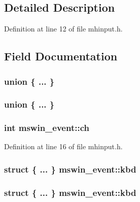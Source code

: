 \subsection{Detailed Description}


Definition at line 12 of file mhinput.\+h.



\subsection{Field Documentation}
\hypertarget{structmswin__event_aee279d14f88567b29a6879fe8aecb2a8}{\subsubsection[{"@34}]{\setlength{\rightskip}{0pt plus 5cm}union \{ ... \} }}\label{structmswin__event_aee279d14f88567b29a6879fe8aecb2a8}
\hypertarget{structmswin__event_a504b7fb000579af49b551a807d3fbce8}{\subsubsection[{"@46}]{\setlength{\rightskip}{0pt plus 5cm}union \{ ... \} }}\label{structmswin__event_a504b7fb000579af49b551a807d3fbce8}
\hypertarget{structmswin__event_a65ae83d1c2eb060bc9bffde57071fdb9}{
\subsubsection[{ch}]{\setlength{\rightskip}{0pt plus 5cm}int mswin\+\_\+event\+::ch}}\label{structmswin__event_a65ae83d1c2eb060bc9bffde57071fdb9}


Definition at line 16 of file mhinput.\+h.

\hypertarget{structmswin__event_a3aac2cede6fd42df678df4df934b2de8}{
\subsubsection[{kbd}]{\setlength{\rightskip}{0pt plus 5cm}struct \{ ... \}   mswin\+\_\+event\+::kbd}}\label{structmswin__event_a3aac2cede6fd42df678df4df934b2de8}
\hypertarget{structmswin__event_a42d63af297fdf4fdf081198553a74c57}{
\subsubsection[{kbd}]{\setlength{\rightskip}{0pt plus 5cm}struct \{ ... \}   mswin\+\_\+event\+::kbd}}\label{structmswin__event_a42d63af297fdf4fdf081198553a74c57}


